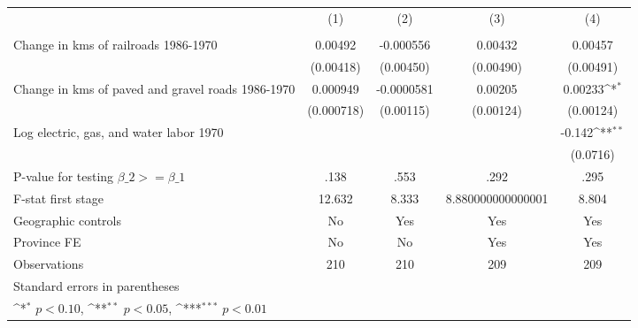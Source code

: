 {
\def\sym#1{\ifmmode^{#1}\else\(^{#1}\)\fi}
\begin{tabular}{l*{4}{c}}
\hline\hline
                &\multicolumn{1}{c}{(1)}&\multicolumn{1}{c}{(2)}&\multicolumn{1}{c}{(3)}&\multicolumn{1}{c}{(4)}\\
                &\multicolumn{1}{c}{}&\multicolumn{1}{c}{}&\multicolumn{1}{c}{}&\multicolumn{1}{c}{}\\
\hline
Change in kms of railroads 1986-1970&  0.00492         &-0.000556         &  0.00432         &  0.00457         \\
                &(0.00418)         &(0.00450)         &(0.00490)         &(0.00491)         \\
[1em]
Change in kms of paved and gravel roads 1986-1970& 0.000949         &-0.0000581         &  0.00205         &  0.00233\sym{*}  \\
                &(0.000718)         &(0.00115)         &(0.00124)         &(0.00124)         \\
[1em]
Log electric, gas, and water labor 1970&                  &                  &                  &   -0.142\sym{**} \\
                &                  &                  &                  & (0.0716)         \\
\hline
P-value for testing $\beta\_{2} >= \beta\_{1}$&     .138         &     .553         &     .292         &     .295         \\
F-stat first stage&   12.632         &    8.333         &8.880000000000001         &    8.804         \\
Geographic controls&       No         &      Yes         &      Yes         &      Yes         \\
Province FE     &       No         &       No         &      Yes         &      Yes         \\
Observations    &      210         &      210         &      209         &      209         \\
\hline\hline
\multicolumn{5}{l}{\footnotesize Standard errors in parentheses}\\
\multicolumn{5}{l}{\footnotesize \sym{*} \(p<0.10\), \sym{**} \(p<0.05\), \sym{***} \(p<0.01\)}\\
\end{tabular}
}
